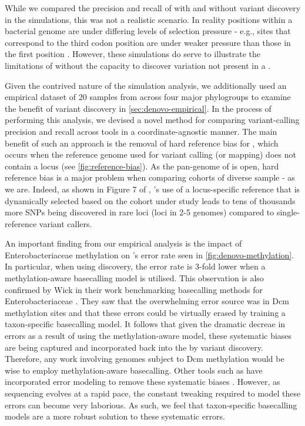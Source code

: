 While we compared the precision and recall of \pandora{} with and without variant discovery in the simulations, this was not a realistic scenario. In reality positions within a bacterial genome are under differing levels of selection pressure - e.g., sites that correspond to the third codon position are under weaker pressure than those in the first position \cite{Lobry2002}. However, these simulations do serve to illustrate the limitations of \pandora{} without the capacity to discover variation not present in a \panrg{}.  

Given the contrived nature of the simulation analysis, we additionally used an empirical dataset of 20 \ecoli{} samples from across four major phylogroups to examine the benefit of \denovo{} variant discovery in \autoref{sec:denovo-empirical}. In the process of performing this analysis, we devised a novel method for comparing variant-calling precision and recall across tools in a coordinate-agnostic manner. The main benefit of such an approach is the removal of hard reference bias for \pandora{}, which occurs when the reference genome used for variant calling (or mapping) does not contain a locus (see \autoref{fig:reference-bias}). As the pan-genome of \ecoli{} is open, hard reference bias is a major problem when comparing cohorts of diverse sample - as we are. Indeed, as shown in Figure 7 of \cite{pandora}, \pandora{}'s use of a locus-specific reference that is dynamically selected based on the cohort under study leads to tens of thousands more SNPs being discovered in rare loci (loci in 2-5 genomes) compared to single-reference variant callers.

An important finding from our empirical analysis is the impact of Enterobacteriaceae methylation on \pandora{}'s \ont{} error rate seen in \autoref{fig:denovo-methylation}. In particular, when using \denovo{} discovery, the \ont{} error rate is 3-fold lower when a methylation-aware basecalling model is utilised. This observation is also confirmed by Wick \etal{} in their work benchmarking \ont{} basecalling methods for Enterobacteriaceae \cite{wick2019}. They saw that the overwhelming error source was in Dcm methylation sites and that these errors could be virtually erased by training a taxon-specific basecalling model. It follows that given the dramatic decreae in \denovo{} errors as a result of using the methylation-aware model, these systematic biases are being captured and incorporated back into the \panrg{} by variant discovery. Therefore, any \ont{} work involving genomes subject to Dcm methylation would be wise to employ methylation-aware basecalling. Other tools such as  have incorporated error modeling to remove these systematic biases \cite{Loman2015}. However, as \ont{} sequencing evolves at a rapid pace, the constant tweaking required to model these errors can become very laborious. As such, we feel that taxon-specific basecalling models are a more robust solution to these systematic errors.

